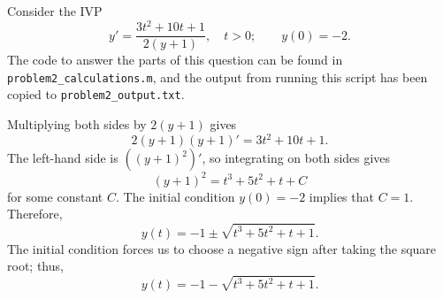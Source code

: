 \documentclass{homework}
\begin{document}
	\question
	
	Consider the IVP
	\begin{equation}
		y' = \frac{3t^2+10t+1}{2(y+1)}, \quad t > 0; \qquad y(0) = -2.
	\end{equation}
	The code to answer the parts of this question can be found in \lstinline{problem2_calculations.m}, and the output from running this script has been copied to \lstinline{problem2_output.txt}.
	
	\begin{arabicparts}
		\questionpart Multiplying both sides by $2(y+1)$ gives
		\begin{equation}
			2(y+1)(y+1)' = 3t^2+10t+1.
		\end{equation}
		The left-hand side is $\left((y+1)^2\right)'$, so integrating on both sides gives
		\begin{equation}
			(y+1)^2 = t^3+5t^2+t+C
		\end{equation}
		for some constant $C$. The initial condition $y(0) = -2$ implies that $C = 1$. Therefore,
		\begin{equation}
			y(t) = -1 \pm \sqrt{t^3+5t^2+t+1}.
		\end{equation}
		The initial condition forces us to choose a negative sign after taking the square root; thus,
		\begin{equation}
			y(t) = -1 - \sqrt{t^3+5t^2+t+1}.
		\end{equation}
		

\end{arabicparts}
\end{document}
